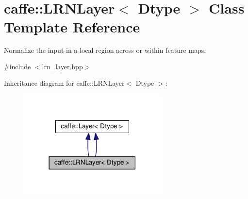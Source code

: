 \hypertarget{classcaffe_1_1_l_r_n_layer}{}\section{caffe\+:\+:L\+R\+N\+Layer$<$ Dtype $>$ Class Template Reference}
\label{classcaffe_1_1_l_r_n_layer}


Normalize the input in a local region across or within feature maps.  




{\ttfamily \#include $<$lrn\+\_\+layer.\+hpp$>$}



Inheritance diagram for caffe\+:\+:L\+R\+N\+Layer$<$ Dtype $>$\+:
\nopagebreak
\begin{figure}[H]
\begin{center}
\leavevmode
\includegraphics[width=213pt]{classcaffe_1_1_l_r_n_layer__inherit__graph}
\end{center}
\end{figure}
